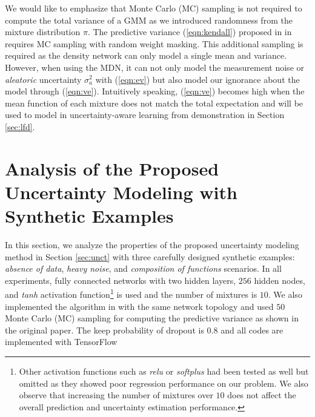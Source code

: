 \documentclass[letterpaper, 10 pt, conference]{ieeeconf}  %
\begin{document}
We would like to emphasize that
Monte Carlo (MC) sampling is not required 
to compute the total variance of a GMM 
as we introduced randomness from the mixture distribution $\pi$. 
The predictive variance (\ref{eqn:kendall}) 
proposed in in \cite{Kendall_17}
requires MC sampling with random weight masking.
This additional sampling is required as
the density network can only model a single mean and variance.
However, when using the MDN,
it can not only model the measurement noise
or \textit{aleatoric} uncertainty $\sigma^2_a$ with (\ref{eqn:ev})
but also model our ignorance about the model
through (\ref{eqn:ve}).
Intuitively speaking, (\ref{eqn:ve}) becomes high
when the mean function of each mixture does not match 
the total expectation
and will be used to model 
in uncertainty-aware learning from demonstration
in Section \ref{sec:lfd}.






\section{Analysis of the Proposed Uncertainty Modeling with Synthetic Examples} \label{sec:toy}

In this section, we analyze the properties of 
the proposed uncertainty modeling method in Section \ref{sec:unct}
with three carefully designed synthetic examples: 
\textit{absence of data}, \textit{heavy noise}, and 
\textit{composition of functions} scenarios.
In all experiments, fully connected networks
with two hidden layers, $256$ hidden nodes, and 
\textit{tanh} activation function\footnote{
Other activation functions such as \textit{relu} or \textit{softplus}
had been tested as well but omitted as they showed poor regression 
performance on our problem. 
We also observe that increasing the number of mixtures over $10$
does not affect the overall prediction and uncertainty estimation performance.}
is used and 
the number of mixtures is $10$. 
We also implemented the algorithm in \cite{Kendall_17} with the 
same network topology and used $50$ Monte Carlo (MC)
sampling for computing the predictive variance
as shown in the original paper.
The keep probability of dropout is $0.8$ and 
all codes are implemented with TensorFlow \cite{Abadi_16}
\end{document}
